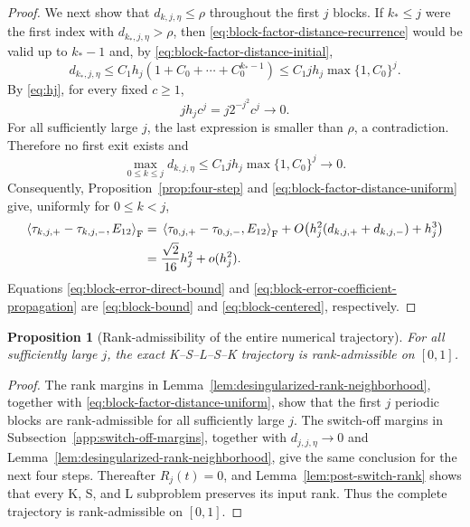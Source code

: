 \documentclass[10pt,a4paper]{amsart}
\numberwithin{equation}{section}
\newtheorem{proposition}[theorem]{Proposition}
\newcommand{\F}{\mathrm F}
\newcommand{\ip}[2]{\left\langle #1,#2\right\rangle_{\F}}
\begin{document}
\begin{proof}
We next show that $d_{k,j,\eta}\le\rho$ throughout the first
$j$ blocks.  If $k_*\le j$ were the first index
with $d_{k_*,j,\eta}>\rho$, then
\eqref{eq:block-factor-distance-recurrence} would be valid up to
$k_*-1$ and, by \eqref{eq:block-factor-distance-initial},
\begin{equation}\label{eq:block-factor-distance-convergence}
 d_{k_*,j,\eta}
 \le C_1h_j(1+C_0+\cdots+C_0^{k_*-1})
 \le C_1jh_j\max\{1,C_0\}^{j}.
\end{equation}
By \eqref{eq:hj}, for every fixed $c\ge1$,
\[
 jh_jc^j=j2^{-j^2}c^j\longrightarrow0.
\]
For all sufficiently large $j$, the last expression is smaller than
$\rho$, a contradiction.  Therefore no first exit exists and
\begin{equation}\label{eq:block-factor-distance-uniform}
 \max_{0\le k\le j}d_{k,j,\eta}
 \le C_1jh_j\max\{1,C_0\}^{j}\longrightarrow0.
\end{equation}
Consequently, Proposition~\ref{prop:four-step} and
\eqref{eq:block-factor-distance-uniform} give, uniformly for
$0\le k<j$,
\begin{align}
 \ip{\tau_{k,j,+}-\tau_{k,j,-}}{E_{12}}
 &={}
 \ip{\tau_{0,j,+}-\tau_{0,j,-}}{E_{12}}
 +O\!\left(h_j^2(d_{k,j,+}+d_{k,j,-})+h_j^3\right)\notag\\
 &=\frac{\sqrt2}{16}h_j^2+o(h_j^2).
 \label{eq:block-error-coefficient-propagation}
\end{align}
Equations \eqref{eq:block-error-direct-bound} and
\eqref{eq:block-error-coefficient-propagation} are
\eqref{eq:block-bound} and \eqref{eq:block-centered}, respectively.
\end{proof}

\begin{proposition}[Rank-admissibility of the entire numerical trajectory]
\label{prop:full-rank-admissibility}
For all sufficiently large $j$, the exact K--S--L--S--K trajectory is
rank-admissible on $[0,1]$.
\end{proposition}

\begin{proof}
The rank margins in Lemma~\ref{lem:desingularized-rank-neighborhood}, together
with \eqref{eq:block-factor-distance-uniform}, show that the first $j$
periodic blocks are rank-admissible for all sufficiently large $j$.
The switch-off margins in
Subsection~\ref{app:switch-off-margins}, together with
$d_{j,j,\eta}\to0$ and
Lemma~\ref{lem:desingularized-rank-neighborhood}, give the same
conclusion for the next four steps.  Thereafter $R_j(t)=0$, and
Lemma~\ref{lem:post-switch-rank} shows that every K, S, and L subproblem
preserves its input rank.  Thus the complete trajectory is
rank-admissible on $[0,1]$.
\end{proof}
\end{document}

